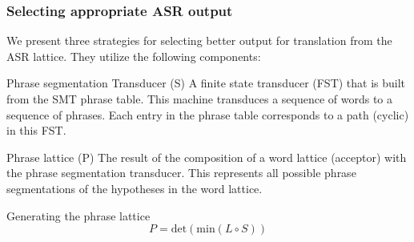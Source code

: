 \documentclass{beamer}
\begin{document}
\begin{frame}
\frametitle{Selecting appropriate ASR output}
We present three strategies for selecting better output for translation from the ASR lattice. They utilize the following components:
\begin{block}{Phrase segmentation Transducer (S)}
A finite state transducer (FST) that is built from the SMT phrase table. This machine transduces a sequence of words to a sequence of phrases.
Each entry in the phrase table corresponds to a path (cyclic) in this FST.
\end{block}

\begin{block}{Phrase lattice (P)}
The result of the composition of a word lattice (acceptor) with the phrase segmentation transducer. This represents all possible 
phrase segmentations of the hypotheses in the word lattice.
\end{block}

\begin{block}{Generating the phrase lattice}
\begin{equation}
P = \text{det}(\text{min}(L \circ S)) \nonumber
\end{equation}
\end{block}
\end{frame}
\end{document}
